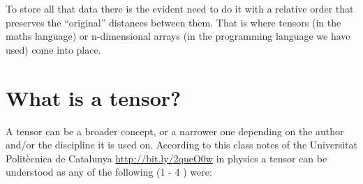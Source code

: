 		To store all that data there is the evident need to do it with a relative order that preserves the ``original'' distances between them. That is where tensors (in the maths language) or n-dimensional arrays (in the programming language we have used) come into place.
		
		\section{What is a tensor?}
		
		A tensor can be a broader concept, or a narrower one depending on the author and/or the discipline it is used on. According to this class notes of the Universitat Politècnica de Catalunya \url{http://bit.ly/2queO0w} in physics a tensor can be understood as any of the following (1 - 4 ) were:
		
